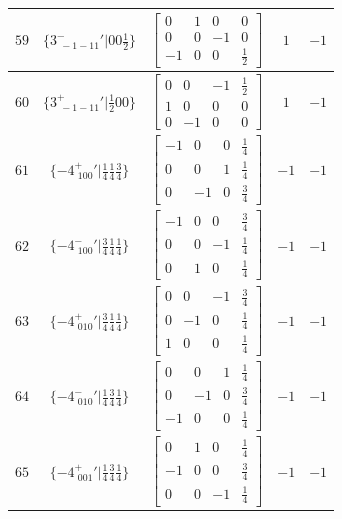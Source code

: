 \documentclass[fleqn,8pt]{jsarticle}
\begin{document}
\begin{longtable}{ccccc}
$ 59 $ & $ \{3^{-}_{\,\,-1-11}{}'|0 0 \frac{1}{2}\} $ & $ \begin{bmatrix} 0 & 1 & 0 & 0 \\ 0 & 0 & -1 & 0 \\ -1 & 0 & 0 & \frac{1}{2} \end{bmatrix} $ & $ 1 $ & $ -1 $ \\ \hline
$ 60 $ & $ \{3^{+}_{\,\,-1-11}{}'|\frac{1}{2} 0 0\} $ & $ \begin{bmatrix} 0 & 0 & -1 & \frac{1}{2} \\ 1 & 0 & 0 & 0 \\ 0 & -1 & 0 & 0 \end{bmatrix} $ & $ 1 $ & $ -1 $ \\ \hline
$ 61 $ & $ \{-4^{+}_{\,\,100}{}'|\frac{1}{4} \frac{1}{4} \frac{3}{4}\} $ & $ \begin{bmatrix} -1 & 0 & 0 & \frac{1}{4} \\ 0 & 0 & 1 & \frac{1}{4} \\ 0 & -1 & 0 & \frac{3}{4} \end{bmatrix} $ & $ -1 $ & $ -1 $ \\ \hline
$ 62 $ & $ \{-4^{-}_{\,\,100}{}'|\frac{3}{4} \frac{1}{4} \frac{1}{4}\} $ & $ \begin{bmatrix} -1 & 0 & 0 & \frac{3}{4} \\ 0 & 0 & -1 & \frac{1}{4} \\ 0 & 1 & 0 & \frac{1}{4} \end{bmatrix} $ & $ -1 $ & $ -1 $ \\ \hline
$ 63 $ & $ \{-4^{+}_{\,\,010}{}'|\frac{3}{4} \frac{1}{4} \frac{1}{4}\} $ & $ \begin{bmatrix} 0 & 0 & -1 & \frac{3}{4} \\ 0 & -1 & 0 & \frac{1}{4} \\ 1 & 0 & 0 & \frac{1}{4} \end{bmatrix} $ & $ -1 $ & $ -1 $ \\ \hline
$ 64 $ & $ \{-4^{-}_{\,\,010}{}'|\frac{1}{4} \frac{3}{4} \frac{1}{4}\} $ & $ \begin{bmatrix} 0 & 0 & 1 & \frac{1}{4} \\ 0 & -1 & 0 & \frac{3}{4} \\ -1 & 0 & 0 & \frac{1}{4} \end{bmatrix} $ & $ -1 $ & $ -1 $ \\ \hline
$ 65 $ & $ \{-4^{+}_{\,\,001}{}'|\frac{1}{4} \frac{3}{4} \frac{1}{4}\} $ & $ \begin{bmatrix} 0 & 1 & 0 & \frac{1}{4} \\ -1 & 0 & 0 & \frac{3}{4} \\ 0 & 0 & -1 & \frac{1}{4} \end{bmatrix} $ & $ -1 $ & $ -1 $ \\ \hline

\end{longtable}
\end{document}
